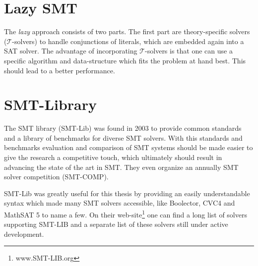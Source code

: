 \section{Lazy SMT}
The \textit{lazy} approach consists of two parts. The first part are theory-specific solvers ($\mathcal{T}$-solvers) to handle conjunctions of literals, which are embedded again into a SAT solver. The advantage of incorporating $\mathcal{T}$-solvers is that one can use a specific algorithm and data-structure which fits the problem at hand best. This should lead to a better performance.~\cite{sebastiani2007lazy}

\section{SMT-Library}
The SMT library (SMT-Lib) was found in 2003 to provide common standards and a library of benchmarks for diverse SMT solvers. With this standards and benchmarks evaluation and comparison of SMT systems should be made easier to give the research a competitive touch, which ultimately should result in advancing the state of the art in SMT. They even organize an annually SMT solver competition (SMT-COMP).

SMT-Lib was greatly useful for this thesis by providing an easily understandable syntax which made many SMT solvers accessible, like Boolector, CVC4 and MathSAT 5 to name a few. On their web-site\footnote{www.SMT-LIB.org} one can find a long list of solvers supporting SMT-LIB and a separate list of these solvers still under active development.

